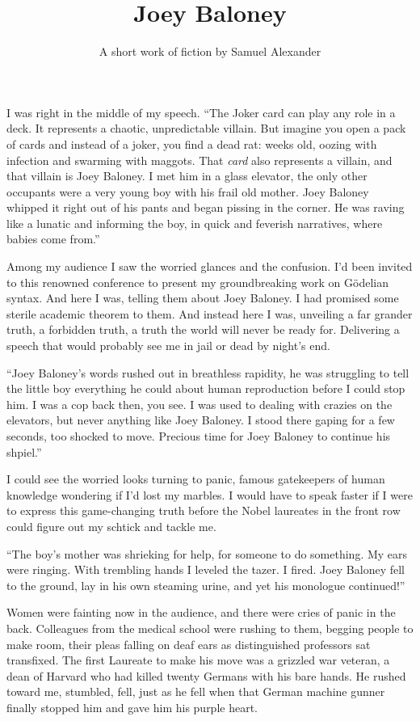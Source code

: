 \documentclass{memoir}
\title{Joey Baloney}
\author{A short work of fiction by Samuel Alexander}
\date{}
\begin{document}
\maketitle

I was right in the middle of my speech.  ``The Joker card can play any role in a deck.
It represents a chaotic, unpredictable villain.
But imagine you open a pack of cards and instead of a joker, you find a dead rat: weeks old,
oozing with infection and swarming with maggots.  That \emph{card} also represents a villain,
and that villain is Joey Baloney.  I met him in a glass elevator, the only other occupants were
a very young boy with his frail old mother.
Joey Baloney whipped it right out of his pants and began pissing
in the corner.  He was raving like a lunatic and informing the boy, in quick and
feverish narratives, where babies come from.''

Among my audience I saw the worried glances and the confusion.  I'd been invited to this renowned
conference to present my groundbreaking work on G\"odelian syntax.  And here I was,
telling them about Joey Baloney.  I had promised some sterile academic theorem to them.
And instead here I was, unveiling a far grander truth, a forbidden truth, a truth
the world will never be ready for.  Delivering a speech that would probably see me in jail or
dead by night's end.  

``Joey Baloney's words rushed out in breathless rapidity, he was struggling to tell the little boy
everything he could about human reproduction before I could stop him.  I was a cop back then, you see.
I was used to dealing with crazies on the elevators, but never anything like Joey Baloney.
I stood there gaping for a few seconds, too shocked to move.  Precious time for Joey Baloney to
continue his shpiel.''

I could see the worried looks turning to panic, famous gatekeepers of human knowledge wondering
if I'd lost my marbles.  I would have to speak faster if I were to express this game-changing truth
before the Nobel laureates in the front row could figure out my schtick and tackle me. 

``The boy's mother was shrieking for help, for someone to do something.  My ears were ringing.
With trembling hands I leveled the tazer.  I fired.  Joey Baloney fell to the ground, lay
in his own steaming urine, and yet his monologue continued!''

Women were fainting now in the audience, and there were cries of panic in the back.
Colleagues from the medical school were rushing to them, begging people to make room,
their pleas falling on deaf ears as distinguished professors sat transfixed.
The first Laureate to make his move was a grizzled war veteran, a dean of Harvard who had
killed twenty Germans with his bare hands.  He rushed toward me,
stumbled, fell, just as he fell when that German machine gunner finally stopped him and gave
him his purple heart.  
\end{document}
